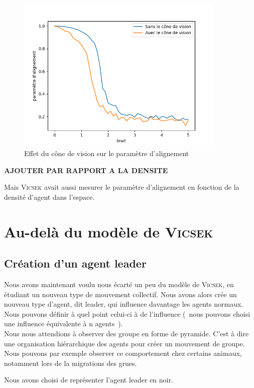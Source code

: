 \documentclass[french, a4paper, 12pt, openany]{report}
\begin{document}
	 \begin{figure}[!h]
		\centering
		\includegraphics[width=10cm]{images/bruit_comparaison[50 mesures par pts].png}
		\caption{Effet du cône de vision sur le paramètre d'alignement}
		\label{cone_vision_alignement}
	\end{figure}
    
    \textbf{AJOUTER PAR RAPPORT A LA DENSITE }
    
    Mais \textsc{Vicsek} avait aussi mesurer le paramètre d'alignement en fonction de la densité d'agent dans l'espace.
     
    \section{Au-delà du modèle de \textsc{Vicsek}}
    \subsection{Création d'un agent leader}
       
       Nous avons maintenant voulu nous écarté un peu du modèle de \textsc{Vicsek}, en étudiant un nouveau type de mouvement collectif. Nous avons alors crée un nouveau type d'agent, dit leader, qui influence davantage les agents normaux. Nous pouvons définir à quel point celui-ci à de l'influence (~nous pouvons choisi une influence équivalente à n agents~).\\
       
       Nous nous attendions à observer des groupe en forme de pyramide. C'est à dire une organisation hiérarchique des agents pour créer un mouvement de groupe. Nous pouvons par exemple observer ce comportement chez certains animaux, notamment lors de la migrations des grues. 
       
       Nous avons choisi de représenter l'agent leader en noir.
       
\end{document}
